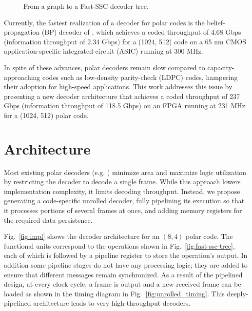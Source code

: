 \documentclass[letterpaper,onecolumn,journal,12pt]{IEEEtran}
\begin{document}
\begin{figure}[ht]
{

 }
  \caption{From a graph to a Fast-SSC decoder tree.}
  \label{fig:graph-to-tree}
\end{figure}

Currently, the fastest realization of a decoder for polar codes is the belief-propagation (BP) decoder of \cite{Park2014}, which achieves a coded throughput of 4.68 Gbps (information throughput of 2.34 Gbps) for a (1024, 512) code on a 65 nm CMOS  application-specific integrated-circuit (ASIC) running at 300 MHz.

In spite of these advances, polar decoders remain slow compared to capacity-approaching codes such as low-density parity-check (LDPC) codes, hampering their adoption for high-speed applications. This work addresses this issue by presenting a new decoder architecture that achieves a coded throughput of 237 Gbps (information throughput of 118.5 Gbps) on an FPGA running at 231 MHz for a (1024, 512) polar code.

\section{Architecture}
Most existing polar decoders (e.g. \cite{Raymond2014,Sarkis2014,Park2014}) minimize area and maximize logic utilization by restricting the decoder to decode a single frame. While this approach lowers implementation complexity, it limits decoding throughput. Instead, we propose generating a code-specific unrolled decoder, fully pipelining its execution so that it processes portions of several frames at once, and adding memory registers for the required data persistence.

Fig.~\ref{fig:impl} shows the decoder architecture for an $(8, 4)$ polar code. The functional units correspond to the operations shown in Fig.~\ref{fig:fast-ssc-tree}, each of which is followed by a pipeline register to store the operation's output. In addition some pipeline stages do not have any processing logic; they are added to ensure that different messages remain synchronized.
As a result of the pipelined design, at every clock cycle, a frame is output and a new received frame can be loaded as shown in the timing diagram in Fig.~\ref{fig:unrolled_timing}. This deeply-pipelined architecture leads to very high-throughput decoders.
\end{document}
